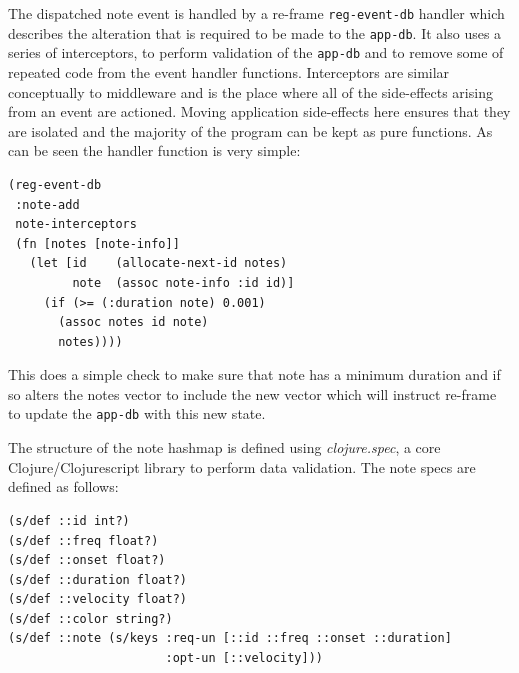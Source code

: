 \documentclass[12pt]{report}
\begin{document}
The dispatched note event is handled by a re-frame \texttt{reg-event-db} handler which
describes the alteration that is required to be made to the \texttt{app-db}. It also
uses a series of interceptors, to perform validation of the \texttt{app-db} and to
remove some of repeated code from the event handler functions. Interceptors are
similar conceptually to middleware and is the place where all of the
side-effects arising from an event are actioned. Moving application side-effects
here ensures that they are isolated and the majority of the program can be kept
as pure functions. As can be seen the handler function is very simple:
\begin{footnotesize}
\begin{verbatim}
(reg-event-db
 :note-add
 note-interceptors
 (fn [notes [note-info]]
   (let [id    (allocate-next-id notes)
         note  (assoc note-info :id id)]
     (if (>= (:duration note) 0.001)
       (assoc notes id note)
       notes))))
\end{verbatim}
\end{footnotesize}
This does a simple check to make sure that note has a minimum duration and if so
alters the notes vector to include the new vector which will instruct re-frame
to update the \texttt{app-db} with this new state.

The structure of the note hashmap is defined using \emph{clojure.spec}, a core
Clojure/Clojurescript library to perform data validation. The note specs are
defined as follows:
\begin{footnotesize}
\begin{verbatim}
(s/def ::id int?)
(s/def ::freq float?)
(s/def ::onset float?)
(s/def ::duration float?)
(s/def ::velocity float?)
(s/def ::color string?)
(s/def ::note (s/keys :req-un [::id ::freq ::onset ::duration]
                      :opt-un [::velocity]))
\end{verbatim}
\end{footnotesize}
\end{document}

